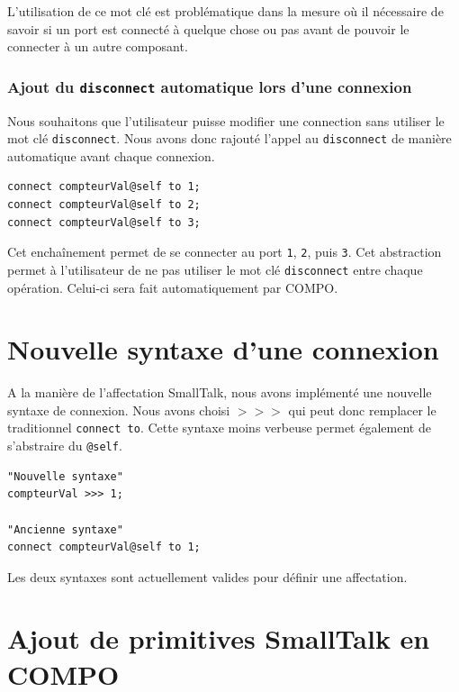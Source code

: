 \documentclass[11pt,a4paper,openany,oneside]{book}
\begin{document}
L'utilisation de ce mot clé est problématique dans la mesure où il nécessaire de savoir si un port est connecté à quelque chose ou pas avant de pouvoir le connecter à un autre composant. 

\subsubsection{Ajout du \texttt{disconnect} automatique lors d'une connexion}

Nous souhaitons que l'utilisateur puisse modifier une connection sans utiliser le mot clé \texttt{disconnect}. Nous avons donc rajouté l'appel au \texttt{disconnect} de manière automatique avant chaque connexion.

\begin{lstlisting}[language=Compo, frame=single, caption=Syntaxe d'une connexion entre un port et un littéral]
connect compteurVal@self to 1;
connect compteurVal@self to 2;
connect compteurVal@self to 3;
\end{lstlisting}

Cet enchaînement permet de se connecter au port \texttt{1}, \texttt{2}, puis \texttt{3}. Cet abstraction permet à l'utilisateur de ne pas utiliser le mot clé \texttt{disconnect} entre chaque opération. Celui-ci sera fait automatiquement par COMPO. 

\section{Nouvelle syntaxe d'une connexion}

A la manière de l'affectation SmallTalk, nous avons implémenté une nouvelle syntaxe de connexion. Nous avons choisi $>>>$ qui peut donc remplacer le traditionnel \texttt{connect to}. Cette syntaxe moins verbeuse permet également de s'abstraire du \texttt{@self}.

\begin{lstlisting}[language=Compo, frame=single, caption=Comparaison entre l'ancienne et la nouvelle syntaxe d'une connexion]
"Nouvelle syntaxe"
compteurVal >>> 1;

"Ancienne syntaxe"
connect compteurVal@self to 1;
\end{lstlisting}

Les deux syntaxes sont actuellement valides pour définir une affectation.

\section{Ajout de primitives SmallTalk en COMPO}
\end{document}
